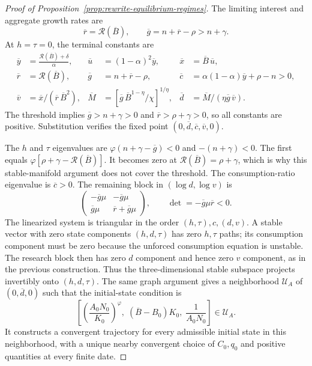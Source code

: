 \begin{proof}[Proof of Proposition~\ref{prop:rewrite-equilibrium-regimes}]
The limiting interest and aggregate growth rates are
\begin{equation}
 \overline r=\mathcal R(\overline B),\qquad
 \overline g=n+\overline r-\rho>n+\gamma.
 \label{eq:rewrite-substitutes-terminal-growth}
\end{equation}
At $h=\tau=0$, the terminal constants are
\begin{align}
 \overline y&=\frac{\mathcal R(\overline B)+\delta}{\alpha},&
 \overline u&=(1-\alpha)^2\overline y,&
 \overline x&=\overline B\,\overline u,\nonumber\\
 \overline r&=\mathcal R(\overline B),&
 \overline g&=n+\overline r-\rho,&
 \overline c&=\alpha(1-\alpha)\overline y+\rho-n>0,\nonumber\\
 \overline v&=\overline x/(\overline r\,\overline B^2),&
 \overline M&=
 \left[\overline g\,\overline B^{1-\eta}/\chi\right]^{1/\eta},&
 \overline d&=\overline M/(\eta\overline g\,\overline v).
 \label{eq:rewrite-ai-terminal-values}
\end{align}
The threshold implies $\overline g>n+\gamma>0$ and
$\overline r>\rho+\gamma>0$, so all constants are positive.
Substitution verifies the fixed point
$(0,\overline d,\overline c,\overline v,0)$.

The $h$ and $\tau$ eigenvalues are
$\varphi(n+\gamma-\overline g)<0$ and $-(n+\gamma)<0$.
The first equals $\varphi[\rho+\gamma-\mathcal R(\overline B)]$.
It becomes zero at $\mathcal R(\overline B)=\rho+\gamma$, which is why
this stable-manifold argument does not cover the threshold.
The consumption-ratio eigenvalue is $\overline c>0$.
The remaining block in $(\log d,\log v)$ is
\[
 \begin{pmatrix}
 -\overline g\mu&-\overline g\mu\\
 \overline g\mu&\overline r+\overline g\mu
 \end{pmatrix},
 \qquad \det=-\overline g\mu\overline r<0.
\]
The linearized system is triangular in the order
$(h,\tau),c,(d,v)$. A stable vector with zero state components $(h,d,\tau)$
has zero $h,\tau$ paths; its consumption component must be zero because the
unforced consumption equation is unstable. The research block then has zero
$d$ component and hence zero $v$ component, as in the previous construction.
Thus the three-dimensional stable subspace projects invertibly onto
$(h,d,\tau)$. The same graph argument gives a neighborhood
$\mathcal U_A$ of $(0,\overline d,0)$ such that the initial-state condition is
\begin{equation}
 \left[\left(\frac{A_0N_0}{K_0}\right)^\varphi,\;
       (\overline B-B_0)K_0,\; \frac{1}{A_0N_0}\right]\in\mathcal U_A.
 \label{eq:rewrite-ai-local-initial}
\end{equation}
It constructs a convergent trajectory for every admissible initial state
in this neighborhood, with a unique nearby convergent choice
of $C_0,q_0$ and positive quantities at every finite date.


\end{proof}
